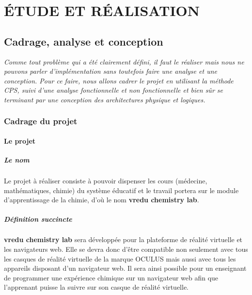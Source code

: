 \part{ÉTUDE ET RÉALISATION}

\chapter{Cadrage, analyse et conception}

\textit{Comme tout problème qui a été clairement défini, il faut le réaliser mais nous ne pouvons
	parler d’implémentation sans toutefois faire une analyse et une conception. Pour ce faire,
	nous allons cadrer le projet en utilisant la méthode CPS, suivi d’une analyse
	fonctionnelle et non fonctionnelle et bien sûr se terminant par une conception des architectures
	physique et logiques.}

\clearpage

\section{Cadrage du projet}

\subsection{Le projet}

\subsubsection{Le nom}

Le projet à réaliser consiste à pouvoir dispenser les cours (médecine, mathématiques, chimie)
du système éducatif et le travail portera sur le module d’apprentissage de la chimie, d’où le
nom \textbf{vredu chemistry lab}.

\subsubsection{Définition succincte}

\textbf{vredu chemistry lab} sera développée pour la plateforme de réalité virtuelle et les navigateurs web. Elle se devra donc d’être compatible non seulement avec tous les casques de réalité virtuelle de la marque OCULUS mais aussi avec tous les appareils disposant d’un navigateur web. Il sera ainsi possible pour un enseignant de programmer une expérience chimique sur un navigateur web afin que l'apprenant puisse la suivre sur son casque de réalité virtuelle.

